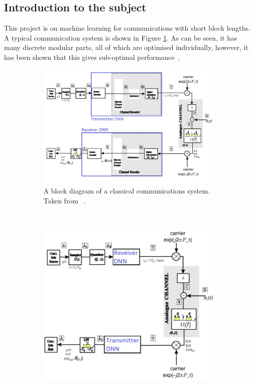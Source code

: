 \documentclass[12pt,onecolumn,letterpaper]{article}
\begin{document}
\subsection{Introduction to the subject}

This project is on machine learning for communications with short block lengths. A typical communication system is shown in Figure \ref{fig:ClassicalCommsBlockDiagram}. As can be seen, it has many discrete modular parts, all of which are optimised individually, however, it has been shown that this gives sub-optimal performance~\cite{ChannelEncodingOptimality}.

\begin{figure}[t!]
   \centering
   \begin{subfigure}[t]{0.45\textwidth}
      \centering
      \includegraphics[width=\linewidth]{figures/classical_comms_block_diagram.png}
      \caption{A block diagram of a classical communications system. Taken from ~\cite{EE3CommsSystemsNotesL4}.}
      \label{fig:ClassicalCommsBlockDiagram}
  \end{subfigure}
  ~
  \begin{subfigure}[t]{0.45\textwidth}
       \centering
       \includegraphics[width=\linewidth]{figures/dnn_block_diagram.png}

\end{subfigure}
\end{figure}
\end{document}
